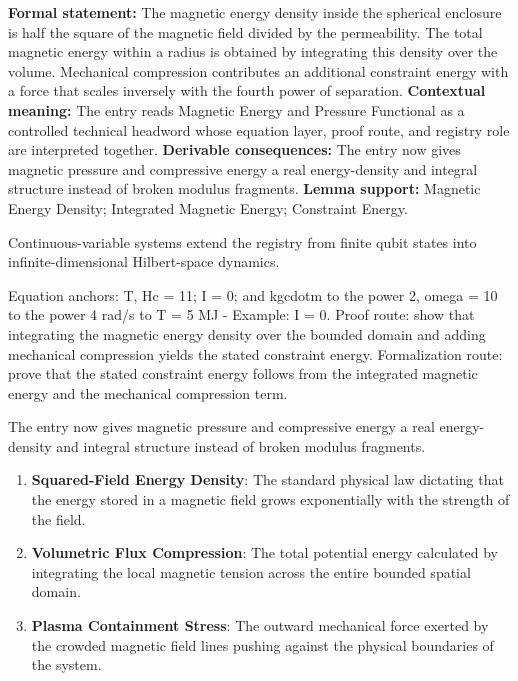 \begingroup\footnotesize\setlength{\emergencystretch}{3em}\sloppy
\textbf{Formal statement:} The magnetic energy density inside the spherical enclosure is half the square of the magnetic field divided by the permeability. The total magnetic energy within a radius is obtained by integrating this density over the volume. Mechanical compression contributes an additional constraint energy with a force that scales inversely with the fourth power of separation. \textbf{Contextual meaning:} The entry reads Magnetic Energy and Pressure Functional as a controlled technical headword whose equation layer, proof route, and registry role are interpreted together. \textbf{Derivable consequences:} The entry now gives magnetic pressure and compressive energy a real energy-density and integral structure instead of broken modulus fragments. \textbf{Lemma support:} Magnetic Energy Density; Integrated Magnetic Energy; Constraint Energy.\par
\endgroup

Continuous-variable systems extend the registry from finite qubit states into infinite-dimensional Hilbert-space dynamics.

Equation anchors: T, Hc = 11; I = 0; and kgcdotm to the power 2, omega = 10 to the power 4 rad/s to T = 5 MJ - Example: I = 0. Proof route: show that integrating the magnetic energy density over the bounded domain and adding mechanical compression yields the stated constraint energy. Formalization route: prove that the stated constraint energy follows from the integrated magnetic energy and the mechanical compression term.

The entry now gives magnetic pressure and compressive energy a real energy-density and integral structure instead of broken modulus fragments.
\endgroup

\begin{enumerate}[leftmargin=1.6em,itemsep=6pt,topsep=4pt]
\item \textbf{Squared-Field Energy Density}: The standard physical law dictating that the energy stored in a magnetic field grows exponentially with the strength of the field.
\item \textbf{Volumetric Flux Compression}: The total potential energy calculated by integrating the local magnetic tension across the entire bounded spatial domain.
\item \textbf{Plasma Containment Stress}: The outward mechanical force exerted by the crowded magnetic field lines pushing against the physical boundaries of the system.
\end{enumerate}


